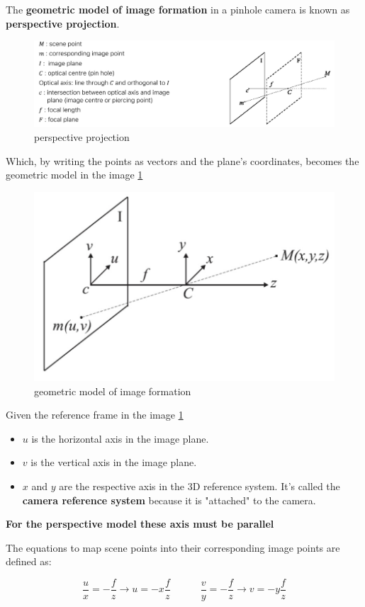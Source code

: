 The \textbf{geometric model of image formation} in a pinhole camera is known as \textbf{perspective projection}.

\begin{figure}[htbp]
  \centering
  \includegraphics[width=0.9\linewidth]{./img/perspective_projection.jpg}
  \caption{perspective projection}
\end{figure}

Which, by writing the points as vectors and the plane's coordinates, becomes the geometric model in the image \ref{fig:perspective_projection_axis}

\begin{figure}[htbp]
  \centering
  \includegraphics[width=0.45\linewidth]{./img/perspective_projection_axis.jpg}
  \caption{geometric model of image formation}
  \label{fig:perspective_projection_axis}
\end{figure}

Given the reference frame in the image \ref{fig:perspective_projection_axis} 
\begin{itemize}
  \item $u$ is the horizontal axis in the image plane.
  \item $v$ is the vertical axis in the image plane.
   \item $x$ and $y$ are the respective axis in the 3D reference system. It's called the \textbf{camera reference system} because it is "attached" to the camera.
\end{itemize}

\textbf{For the perspective model these axis must be parallel}

The equations to map scene points into their corresponding image points are defined as:

$$\frac{u}{x} = -\frac{f}{z} \rightarrow u = -x\frac{f}{z} \quad\quad\quad \frac{v}{y} = - \frac{f}{z} \rightarrow v = -y\frac{f}{z}$$

